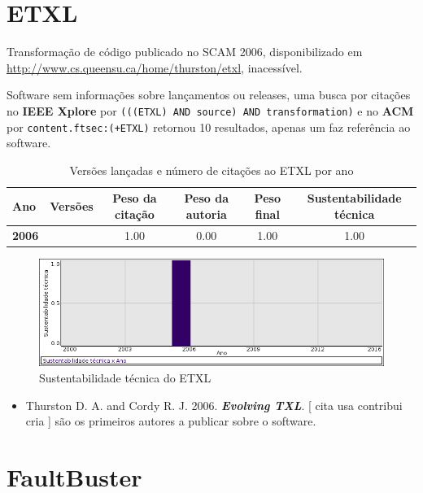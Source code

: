 \section{ETXL}

Transformação de código
publicado no SCAM 2006,
disponibilizado em \url{http://www.cs.queensu.ca/home/thurston/etxl},
inacessível.

Software sem informações sobre lançamentos ou releases,
uma busca por citações no {\bf IEEE Xplore} por
\texttt{(((ETXL) AND source) AND transformation)}
e no {\bf ACM} por
\texttt{content.ftsec:(+ETXL)}
retornou
10 resultados,
apenas um faz referência ao software.


\begin{table}[H]
\caption{Versões lançadas e número de citações ao ETXL por ano}
\centering
\begin{tabular}{| l | c | c | c | c | c |}
  \hline
  Ano & Versões & Peso da citação & Peso da autoria & Peso final & Sustentabilidade técnica \\
  \hline
            {\bf 2006}
          &
          
          &
          1.00
          &
          0.00
          &
          1.00
          &
            {\color{blue} 1.00}
          \\
\hline
\end{tabular}
\end{table}

\begin{figure}[h]
  \center
  \includegraphics[scale=0.50]{imagens/softwares-charts/etxl.png}
  \caption{Sustentabilidade técnica do ETXL}
\end{figure}


\begin{itemize}
\item Thurston D. A. and Cordy R. J.
      2006.
        \textbf{\textit{ Evolving TXL}}.
      [
          cita
          usa
          contribui
          cria
      ]
são os primeiros autores a publicar sobre o software.
\end{itemize}
\section{FaultBuster}

